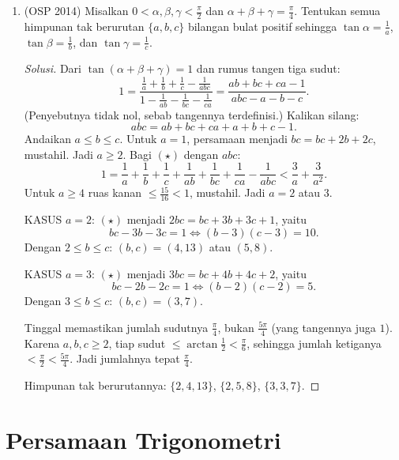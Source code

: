 \documentclass[12pt]{scrartcl}
\begin{document}
\begin{enumerate}
	\item (OSP 2014)
	Misalkan $0 < \alpha, \beta, \gamma < \frac{\pi}{2}$ dan
	$\alpha+\beta+\gamma = \frac{\pi}{4}$. Tentukan semua himpunan tak berurutan
	$\{a, b, c\}$ bilangan bulat positif sehingga $\tan\alpha = \frac1a$,
	$\tan\beta = \frac1b$, dan $\tan\gamma = \frac1c$.
	\begin{proof}[Solusi]
	Dari $\tan(\alpha+\beta+\gamma) = 1$ dan rumus tangen tiga sudut:
	\[ 1 = \frac{\frac1a+\frac1b+\frac1c-\frac{1}{abc}}
	{1-\frac{1}{ab}-\frac{1}{bc}-\frac{1}{ca}}
	= \frac{ab+bc+ca-1}{abc-a-b-c}. \]
	(Penyebutnya tidak nol, sebab tangennya terdefinisi.)
	Kalikan silang:
	\[ abc = ab+bc+ca+a+b+c-1. \tag{$\star$} \]
	Andaikan $a \le b \le c$. Untuk $a = 1$, persamaan menjadi
	$bc = bc + 2b + 2c$, mustahil. Jadi $a \ge 2$.
	Bagi $(\star)$ dengan $abc$:
	\[ 1 = \frac1a+\frac1b+\frac1c+\frac{1}{ab}+\frac{1}{bc}+\frac{1}{ca}-\frac{1}{abc}
	< \frac3a + \frac{3}{a^2}. \]
	Untuk $a \ge 4$ ruas kanan $\le \frac{15}{16} < 1$, mustahil. Jadi $a = 2$ atau $3$.

	KASUS $a = 2$: $(\star)$ menjadi $2bc = bc + 3b + 3c + 1$, yaitu
	\[ bc - 3b - 3c = 1 \iff (b-3)(c-3) = 10. \]
	Dengan $2 \le b \le c$: $(b, c) = (4, 13)$ atau $(5, 8)$.

	KASUS $a = 3$: $(\star)$ menjadi $3bc = bc + 4b + 4c + 2$, yaitu
	\[ bc - 2b - 2c = 1 \iff (b-2)(c-2) = 5. \]
	Dengan $3 \le b \le c$: $(b, c) = (3, 7)$.

	Tinggal memastikan jumlah sudutnya $\frac{\pi}{4}$, bukan $\frac{5\pi}{4}$
	(yang tangennya juga $1$). Karena $a, b, c \ge 2$, tiap sudut
	$\le \arctan\frac12 < \frac{\pi}{6}$, sehingga jumlah ketiganya
	$< \frac{\pi}{2} < \frac{5\pi}{4}$. Jadi jumlahnya tepat $\frac{\pi}{4}$.

	Himpunan tak berurutannya: $\{2,4,13\}$, $\{2,5,8\}$, $\{3,3,7\}$.
	\end{proof}

\end{enumerate}

\section{Persamaan Trigonometri}
\end{document}

